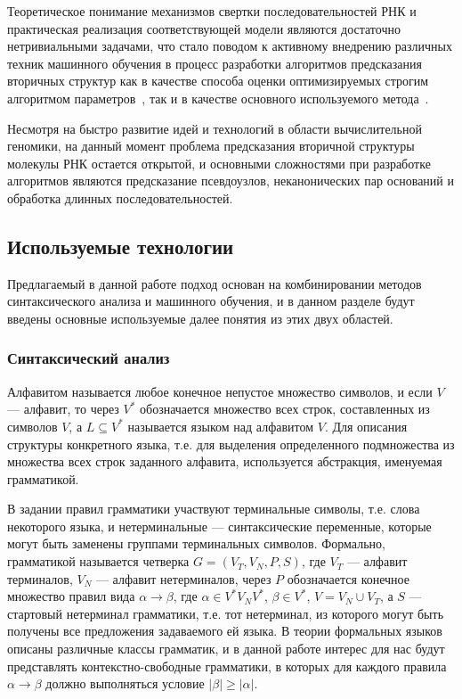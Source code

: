 Теоретическое понимание механизмов свертки последовательностей РНК и практическая реализация соответствующей модели являются достаточно нетривиальными задачами, что стало поводом к активному внедрению различных техник машинного обучения в процесс разработки алгоритмов предсказания вторичных структур как в качестве способа оценки оптимизируемых строгим алгоритмом параметров~\cite{akiyama2018max,do2006contrafold}, так и в качестве основного используемого метода~\cite{singh2019rna,apolloni2003rna}.

Несмотря на быстро развитие идей и технологий в области вычислительной геномики, на данный момент проблема предсказания вторичной структуры молекулы РНК остается открытой, и основными сложностями при разработке алгоритмов являются предсказание псевдоузлов, неканонических пар оснований и обработка длинных последовательностей.

\subsection{Используемые технологии}
Предлагаемый в данной работе подход основан на комбинировании методов синтаксического анализа и машинного обучения, и в данном разделе будут введены основные используемые далее понятия из этих двух областей.

\subsubsection{Синтаксический анализ}
Алфавитом называется любое конечное непустое множество символов, и если $V$ --- алфавит, то через $V^\ast$ обозначается множество всех строк, составленных из символов $V$, а $L \subseteq V^\ast$  называется языком над алфавитом $V$. Для описания структуры конкретного языка, т.е. для выделения определенного подмножества из множества всех строк заданного алфавита, используется абстракция, именуемая грамматикой.

В задании правил грамматики участвуют терминальные символы, т.е. слова некоторого языка, и нетерминальные --- синтаксические переменные, которые могут быть заменены группами терминальных символов. Формально, грамматикой называется четверка $G = (V_T, V_N, P, S)$, где $V_T$ ---  алфавит терминалов, $V_N$ --- алфавит нетерминалов, через $P$ обозначается конечное множество правил вида $\alpha \rightarrow \beta$, где $\alpha \in V^\ast V_N V^\ast$, $\beta \in V^\ast$, $V = V_N \cup V_T$, а $S$ --- стартовый нетерминал грамматики, т.е. тот нетерминал, из которого могут быть получены все предложения задаваемого ей языка. В теории формальных языков описаны различные классы грамматик, и в данной работе интерес для нас будут представлять контекстно-свободные грамматики, в которых для каждого правила $\alpha \rightarrow \beta$ должно выполняться условие $|\beta| \geqslant |\alpha|$.

